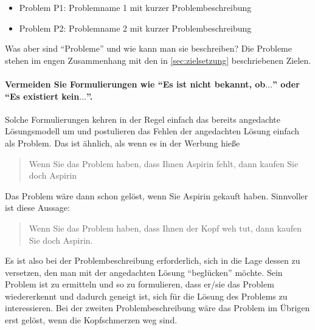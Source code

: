 \begin{itemize}
\item Problem P1: Problemname 1 mit kurzer Problembeschreibung
\item Problem P2: Problemname 2 mit kurzer Problembeschreibung
\end{itemize}

Was aber sind \enquote{Probleme} und wie kann man sie beschreiben?
Die Probleme stehen im engen Zusammenhang mit den in \cref{sec:zielsetzung} beschriebenen Zielen.

\paragraph{Vermeiden Sie Formulierungen wie \enquote{Es ist nicht bekannt, ob$\ldots$} oder \enquote{Es existiert kein$\ldots$}.}
Solche Formulierungen kehren in der Regel einfach das bereits angedachte Lösungsmodell um und postulieren das Fehlen der angedachten Lösung einfach als Problem.
Das ist ähnlich, als wenn es in der Werbung hieße \blockquote{Wenn Sie das Problem haben, dass Ihnen Aspirin fehlt, dann kaufen Sie doch Aspirin}.
Das Problem wäre dann schon gelöst, wenn Sie Aspirin gekauft haben.
Sinnvoller ist diese Aussage:
\blockquote{Wenn Sie das Problem haben, dass Ihnen der Kopf weh tut, dann kaufen Sie doch Aspirin.}
Es ist also bei der Problembeschreibung erforderlich, sich in die Lage dessen zu versetzen, den man mit der angedachten Lösung \enquote{beglücken} möchte.
Sein Problem ist zu ermitteln und so zu formulieren, dass er/sie das Problem wiedererkennt und dadurch geneigt ist, sich für die Lösung des Problems zu interessieren.
Bei der zweiten Problembeschreibung wäre das Problem im Übrigen erst gelöst, wenn die Kopfschmerzen weg sind.


